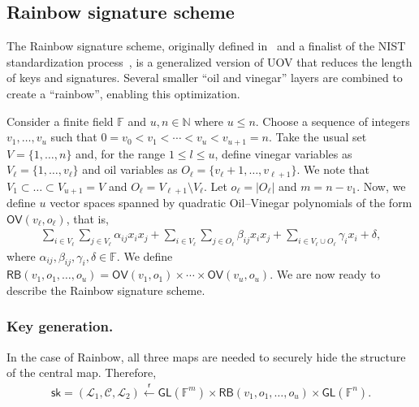 \documentclass[12pt, a4paper, oneside]{memoir}
\newcommand{\random}{\overset{\mathsf{r}}{\gets}}
\theoremstyle{definition}
\begin{document}
\subsection{Rainbow signature scheme}\label{subsec:rainbow}

The Rainbow signature scheme, originally defined in~\cite{Ding:200506} and a finalist of the NIST standardization process~\cite[Sec.~3.20]{Alagic:202007}, is a generalized version of UOV that reduces the length of keys and signatures. Several smaller ``oil and vinegar'' layers are combined to create a ``rainbow'', enabling this optimization.

Consider a finite field $\mathbb{F}$ and $u, n \in \mathbb{N}$ where $u \leq n$. Choose a sequence of integers $v_{1}, \dots, v_{u}$ such that $0 = v_{0} < v_{1} < \cdots < v_{u} < v_{u + 1} = n$. Take the usual set $V = \{1, \dots, n\}$ and, for the range $1 \leq l \leq u$, define vinegar variables as $V_{\ell} = \{1, \dots, v_{\ell}\}$ and oil variables as $O_{\ell} = \{v_{\ell} + 1, \dots, v_{\ell + 1}\}$. We note that $V_{1} \subset \dots \subset V_{u + 1} = V$ and $O_{\ell} = V_{\ell + 1} \setminus V_{\ell}$. Let $o_{\ell} = |O_{\ell}|$ and $m = n - v_{1}$. Now, we define $u$ vector spaces spanned by quadratic Oil--Vinegar polynomials of the form $\mathsf{OV}(v_{\ell}, o_{\ell})$, that is,
\begin{align}\label{eq:oil-vinegar-space}
  \sum_{i \in V_{\ell}} \sum_{j \in V_{\ell}} \alpha_{ij} x_{i} x_{j}
    + \sum_{i \in V_{\ell}} \sum_{j \in O_{\ell}} \beta_{ij} x_{i} x_{j}
    + \sum_{i \in V_{\ell} \cup O_{\ell}} \gamma_{i} x_{i} + \delta,
\end{align}
where $\alpha_{ij}, \beta_{ij}, \gamma_{i}, \delta \in \mathbb{F}$. We define $\mathsf{RB}(v_{1}, o_{1}, \dots, o_{u}) = \mathsf{OV}(v_{1}, o_{1}) \times \cdots \times \mathsf{OV}(v_{u}, o_{u})$. We are now ready to describe the Rainbow signature scheme.

\subsubsection{Key generation.}

In the case of Rainbow, all three maps are needed to securely hide the structure of the central map. Therefore,
\begin{align}\label{eq:sk-rainbow}
  \mathsf{sk} = (\mathcal{L}_{1}, \mathcal{C}, \mathcal{L}_{2})
    \random \mathsf{GL}(\mathbb{F}^{m}) \times \mathsf{RB}(v_{1}, o_{1}, \dots, o_{u}) \times \mathsf{GL}(\mathbb{F}^{n}).
\end{align}
\end{document}
